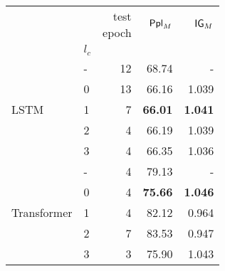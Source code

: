                 
\begin{tabular}{llrrr}
\toprule
                               &       & \makecell{test \\ epoch} & $\mathsf{Ppl}_M$ & $\mathsf{IG}_M$     \\
                               & $l_c$ &         &                 &                   \\
\midrule
\multirow{5}{*}{LSTM}         & - &          12 &  68.74          &       -           \\
                              & 0 &          13 &  66.16          &    1.039          \\
                              & 1 &           7 &  \textbf{66.01} &    \textbf{1.041} \\
                              & 2 &           4 &  66.19          &    1.039          \\
                              & 3 &           4 &  66.35          &    1.036          \\
\midrule
\multirow{5}{*}{Transformer}  & - &           4 &  79.13          &        -          \\
                              & 0 &           4 &  \textbf{75.66} &    \textbf{1.046} \\
                              & 1 &           4 &  82.12          &    0.964          \\
                              & 2 &           7 &  83.53          &    0.947          \\
                              & 3 &           3 &  75.90          &    1.043          \\
\bottomrule
\end{tabular}

